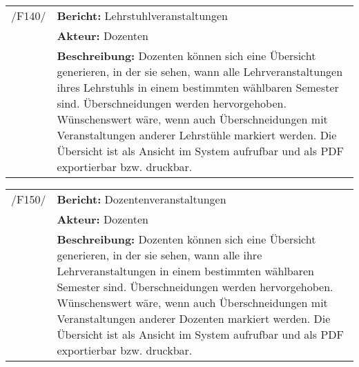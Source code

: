 \begin{tabular}{p{1.5cm}p{14.5cm}}
	
	 /F140/& \textbf{Bericht:} Lehrstuhlveranstaltungen \\
				& \textbf{Akteur:} Dozenten \\
				& \textbf{Beschreibung:} Dozenten können sich eine Übersicht generieren, in der sie sehen, wann alle Lehrveranstaltungen ihres Lehrstuhls in einem bestimmten wählbaren Semester sind. Überschneidungen werden hervorgehoben. Wünschenswert wäre, wenn auch Überschneidungen mit Veranstaltungen anderer Lehrstühle markiert werden. Die Übersicht ist als Ansicht im System aufrufbar und als PDF exportierbar bzw. druckbar. \\[0.25cm]

				
\end{tabular}


\begin{tabular}{p{1.5cm}p{14.5cm}}
	
	 /F150/& \textbf{Bericht:} Dozentenveranstaltungen \\
				& \textbf{Akteur:} Dozenten \\
				& \textbf{Beschreibung:} Dozenten können sich eine Übersicht generieren, in der sie sehen, wann alle ihre Lehrveranstaltungen in einem bestimmten wählbaren Semester sind. Überschneidungen werden hervorgehoben. Wünschenswert wäre, wenn auch Überschneidungen mit Veranstaltungen anderer Dozenten markiert werden. Die Übersicht ist als Ansicht im System aufrufbar und als PDF exportierbar bzw. druckbar. \\[0.25cm]

				
\end{tabular}